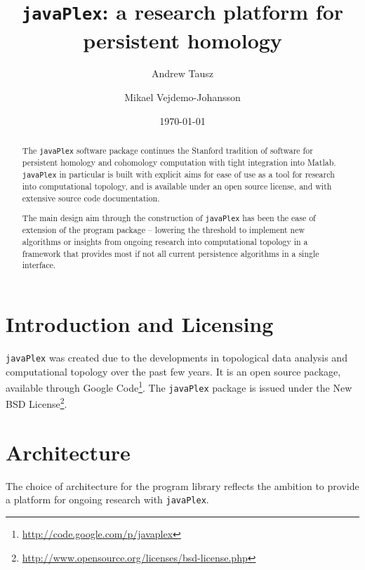 \documentclass[11pt]{amsart}
\newcommand\javaPlex{\texttt{javaPlex}\xspace}
\begin{document}
\title{\javaPlex: a research platform for persistent homology }

\author{Andrew Tausz}
\address{Stanford University, Stanford, CA, 94305}

\author{Mikael Vejdemo-Johansson}
\address{School of Computer Science; University of St Andrews; Scotland}

\date{\today}

\begin{abstract}
  The \javaPlex software package continues the Stanford tradition of software for persistent homology and cohomology computation with tight integration into Matlab. \javaPlex in particular is built with explicit aims for ease of use as a tool for research into computational topology, and is available under an open source license, and with extensive source code documentation.

  The main design aim through the construction of \javaPlex has been the ease of extension of the program package -- lowering the threshold to implement new algorithms or insights from ongoing research into computational topology in a framework that provides most if not all current persistence algorithms in a single interface.
\end{abstract}

\maketitle

\section{Introduction and Licensing}

\javaPlex was created due to the developments in topological data analysis and computational topology over the past few years. It is an open source package, available through Google Code\footnote{\url{http://code.google.com/p/javaplex}}. The \javaPlex package is issued under the New BSD License\footnote{\url{http://www.opensource.org/licenses/bsd-license.php}}. 

\section{Architecture}

The choice of architecture for the program library reflects the ambition to provide a platform for ongoing research with \javaPlex. 
\end{document}
